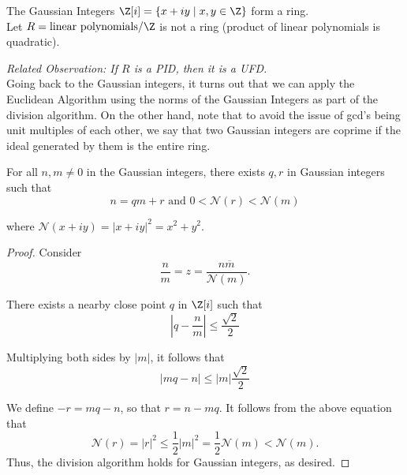 \documentclass[11pt]{article}
\begin{document}
\begin{exercise*}
The Gaussian Integers $\Z[i] = \{ x + iy \mid x, y \in \Z \}$ form a ring. \\

Let $R = \text{linear polynomials} / \Z$ is not a ring (product of linear polynomials is quadratic).
\end{exercise*}

\textit{Related Observation: If $R$ is a PID, then it is a UFD.} \\

Going back to the Gaussian integers, it turns out that we can apply the Euclidean Algorithm using the norms of the Gaussian Integers as part of the division algorithm.
On the other hand, note that to avoid the issue of gcd's being unit multiples of each other, we say that two Gaussian integers are coprime if the ideal generated by them is the entire ring.

\begin{lemma*}
For all $n, m \neq 0$ in the Gaussian integers, there exists $q, r$ in Gaussian integers such that
\[
    n = qm + r \text{ and } 0 < \mathcal{N}(r) < \mathcal{N}(m)
\]

where $\mathcal{N}(x+iy) = |x+iy|^2 = x^2 + y^2$.
\end{lemma*}

\begin{proof}
Consider
\[
    \frac{n}{m} = z = \frac{n \overline{m}}{\mathcal{N}(m)}.
\] 

There exists a nearby close point $q$ in $\Z[i]$ such that 
\[
    \left| q - \frac{n}{m} \right| \leq \frac{\sqrt{2}}{2}
\]

Multiplying both sides by $|m|$, it follows that
\[
    |mq - n| \leq |m|\frac{\sqrt{2}}{2}
\]

We define $-r = mq - n$, so that $r = n - mq$. It follows from the above equation that
\[
    \mathcal{N}(r) = |r|^2 \leq \frac{1}{2}|m|^2 = \frac{1}{2}\mathcal{N}(m) < \mathcal{N}(m).
\]
Thus, the division algorithm holds for Gaussian integers, as desired.
\end{proof}
\end{document}

